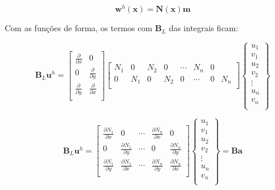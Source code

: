         \begin{equation}
            \mathbf{w}^h(\mathbf{x}) = 
            \mathbf{N}(\mathbf{x})
            \mathbf{m}
        \end{equation}

        Com as funções de forma, os termos com $\mathbf{B}_L$ das integrais ficam:

        \begin{equation*}
            \mathbf{B}_L \mathbf{u}^h = 
             \begin{bmatrix}
                \frac{\partial}{\partial x} & 0\\
                0 & \frac{\partial}{\partial y}\\
                \frac{\partial}{\partial y} & \frac{\partial}{\partial x}\\
            \end{bmatrix}
            \begin{bmatrix}
                N_1 & 0 & N_2 & 0 & \cdots & N_n & 0\\
                0 & N_1 & 0 & N_2 & 0 & \cdots & 0 & N_n\\
            \end{bmatrix}
            \begin{Bmatrix}
                u_1\\
                v_1\\
                u_2\\
                v_2\\
                \vdots\\
                u_n\\
                v_n\\
            \end{Bmatrix}
        \end{equation*}

        \begin{equation}
            \mathbf{B}_L \mathbf{u}^h = 
             \begin{bmatrix}
                \frac{\partial N_1}{\partial x} & 0 & \cdots & \frac{\partial N_n}{\partial x} & 0\\
                0 & \frac{\partial N_1}{\partial y} & \cdots & 0 & \frac{\partial N_n}{\partial y}\\
                \frac{\partial N_1}{\partial y} & \frac{\partial N_1}{\partial x} & \cdots & \frac{\partial N_n}{\partial y} & \frac{\partial N_n}{\partial x}\\
            \end{bmatrix}
            \begin{Bmatrix}
                u_1\\
                v_1\\
                u_2\\
                v_2\\
                \vdots\\
                u_n\\
                v_n\\
            \end{Bmatrix}
            =
            \mathbf{B}
            \mathbf{a}
        \end{equation}

